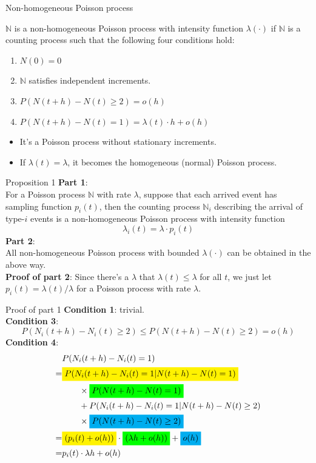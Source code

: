 \documentclass[mathserif]{beamer}
\begin{document}
\begin{frame}{Non-homogeneous Poisson process}
\begin{definition}
$\mathbb{N}$ is a non-homogeneous Poisson process with intensity function $\lambda(\cdot)$ if
$\mathbb{N}$ is a counting process such that the following four conditions hold:
\begin{enumerate}
\item $N(0) = 0$
\item $\mathbb{N}$ satisfies independent increments.
\item $P(N(t+h)-N(t) \geq 2) = o(h)$
\item $P(N(t+h)-N(t) = 1) = \lambda(t)\cdot h + o(h)$
\end{enumerate}
\end{definition}
\begin{itemize}
\item It's a Poisson process without stationary increments.
\item If $\lambda(t) = \lambda$, it becomes the homogeneous (normal) Poisson process.
\end{itemize}
\end{frame}

\begin{frame}{Proposition 1}
\textbf{Part 1}:\\
For a Poisson process $\mathbb{N}$ with rate $\lambda$,
suppose that each arrived event has sampling function $p_i(t)$,
then the counting process $\mathbb{N}_i$ describing the arrival of type-$i$ events
is a non-homogeneous Poisson process with intensity function 
\[
\lambda_i(t) = \lambda\cdot p_i(t)
\]
\textbf{Part 2}:\\
All non-homogeneous Poisson process with bounded $\lambda(\cdot)$ can be obtained in the above way.\\
\textbf{Proof of part 2}: 
Since there's a $\lambda$ that $\lambda(t)\leq \lambda$ for all $t$, 
we just let $p_i(t) = \lambda(t) / \lambda$ for a Poisson process with rate $\lambda$.
\end{frame}

\begin{frame}{Proof of part 1}
\textbf{Condition 1}: trivial.\\
\textbf{Condition 3}:
\[
P(N_i(t+h)-N_i(t)\geq 2)\leq P(N(t+h)-N(t)\geq 2) = o(h)
\]
\textbf{Condition 4}:
\begin{align*}
& P(N_i(t+h)-N_i(t) = 1) \\
= & \colorbox{yellow}{$P(N_i(t+h)-N_i(t) = 1 | N(t+h)-N(t) = 1)$} \\
& \qquad \times \colorbox{green}{$P(N(t+h)-N(t) = 1)$} \\
& \qquad + P(N_i(t+h)-N_i(t) = 1 | N(t+h)-N(t)\geq 2) \\
& \qquad \times \colorbox{cyan}{$P(N(t+h)-N(t)\geq 2)$} \\
= & \colorbox{yellow}{$(p_i(t) + o(h))$}\cdot \colorbox{green}{$(\lambda h + o(h))$} + \colorbox{cyan}{$o(h)$} \\
= & p_i(t)\cdot \lambda h + o(h)
\end{align*}
\end{frame}
\end{document}
